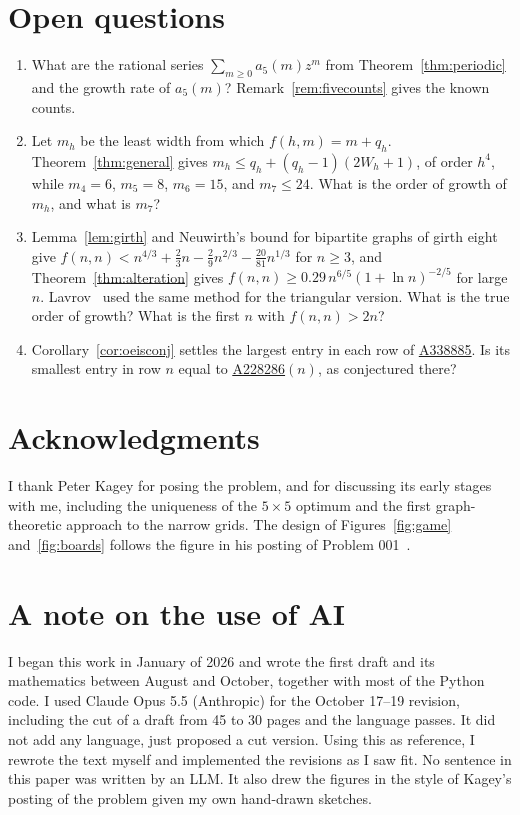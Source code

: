 \documentclass[12pt]{article}
\theoremstyle{plain}
\theoremstyle{definition}
\theoremstyle{remark}
\newcommand{\seqnum}[1]{\href{https://oeis.org/#1}{\rm \underline{#1}}}
\begin{document}
\section{Open questions}\label{sec:open}

\begin{enumerate}[(1),leftmargin=*]
\item What are the rational series $\sum_{m\ge0}a_5(m)z^m$ from
Theorem~\ref{thm:periodic} and the growth rate of $a_5(m)$?
Remark~\ref{rem:fivecounts} gives the known counts.
\item Let $m_h$ be the least width from which $f(h,m)=m+q_h$. Theorem~\ref{thm:general}
gives $m_h\le q_h+(q_h-1)(2W_h+1)$, of order $h^4$, while $m_4=6$, $m_5=8$, $m_6=15$, and
$m_7\le24$. What is the order of growth of $m_h$, and what is $m_7$?
\item Lemma~\ref{lem:girth} and Neuwirth's bound for bipartite graphs of girth
eight~\cite[Corollary~16]{neuwirth2001} give
$f(n,n)<n^{4/3}+\frac23n-\frac29n^{2/3}-\frac{20}{81}n^{1/3}$ for $n\ge3$, and
Theorem~\ref{thm:alteration} gives $f(n,n)\ge0.29\,n^{6/5}(1+\ln n)^{-2/5}$ for large $n$.
Lavrov~\cite{kageyMSE} used the same method for the triangular version. What is the true
order of growth? What is the first $n$ with $f(n,n)>2n$?
\item Corollary~\ref{cor:oeisconj} settles the largest entry in each row of
\seqnum{A338885}. Is its smallest entry in row $n$ equal to
\seqnum{A228286}$(n)$, as conjectured there?
\end{enumerate}
\section{Acknowledgments}\label{sec:ack}

I thank Peter Kagey for posing the problem, and for discussing its early stages with me,
including the uniqueness of the $5\times5$ optimum and the first graph-theoretic approach to
the narrow grids. The design of Figures~\ref{fig:game} and~\ref{fig:boards} follows the figure
in his posting of Problem 001~\cite{kagey001}.

\section*{A note on the use of AI}

I began this work in January of 2026 and wrote the first draft and its mathematics
between August and October, together with most of the Python code. I used
Claude Opus 5.5 (Anthropic) for the October 17--19 revision, including the
cut of a draft from 45 to 30 pages and the language passes.
It did not add any language, just proposed a cut version.
Using this as reference, I rewrote the text myself and implemented the revisions as I saw fit.
No sentence in this paper was written by an LLM.
It also drew the figures in the style of Kagey's posting of the problem given my own hand-drawn sketches.
\end{document}
